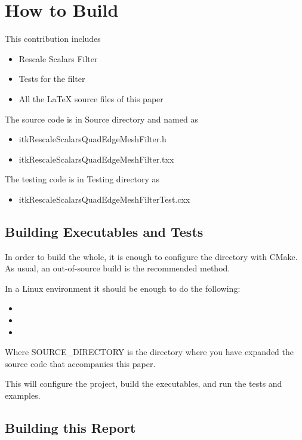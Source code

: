 \documentclass{InsightArticle}
\begin{document}
\section{How to Build}

This contribution includes

\begin{itemize}
\item Rescale Scalars Filter
\item Tests for the filter
\item All the LaTeX source files of this paper
\end{itemize}

The source code is in Source directory and named as 

\begin{itemize}
\item itkRescaleScalarsQuadEdgeMeshFilter.h
\item itkRescaleScalarsQuadEdgeMeshFilter.txx
\end{itemize}

The testing code is in Testing directory as

\begin{itemize}
\item itkRescaleScalarsQuadEdgeMeshFilterTest.cxx
\end{itemize}

\subsection{Building Executables and Tests}

In order to build the whole, it is enough to configure the directory with
CMake. As usual, an out-of-source build is the recommended method.

In a Linux environment it should be enough to do the following:

\begin{itemize}
\item {}
\item {}
\item {}
\end{itemize}

Where SOURCE\_DIRECTORY is the directory where you have expanded the source
code that accompanies this paper.

This will configure the project, build the executables, and run the tests and
examples. 


\subsection{Building this Report}
\end{document}
